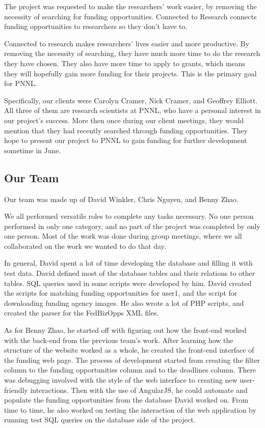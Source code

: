 \documentclass[onecolumn]{IEEEtran}
\begin{document}
The project was requested to make the researchers' work easier, by removing the necessity of searching for funding opportunities. Connected to Research connects funding opportunities to researchers so they don't have to. 

Connected to research makes researchers' lives easier and more productive. By removing the necessity of searching, they have much more time to do the research they have chosen. They also have more time to apply to grants, which means they will hopefully gain more funding for their projects. This is the primary goal for PNNL. 

Specifically, our clients were Carolyn Cramer, Nick Cramer, and Geoffrey Elliott. All three of them are research scientists at PNNL, who have a personal interest in our project's success. More then once during our client meetings, they would mention that they had recently searched through funding opportunities. They hope to present our project to PNNL to gain funding for further development sometime in June. 

\subsection{Our Team}
Our team was made up of David Winkler, Chris Nguyen, and Benny Zhao. 

We all performed versatile roles to complete any tasks necessary. No one person performed in only one category, and no part of the project was completed by only one person. Most of the work was done during group meetings, where we all collaborated on the work we wanted to do that day. 

In general, David spent a lot of time developing the database and filling it with test data. David defined most of the database tables and their relations to other tables. SQL queries used in some scripts were developed by him. David created the scripts for matching funding opportunities for user1, and the script for downloading funding agency images. He also wrote a lot of PHP scripts, and created the parser for the FedBizOpps XML files. 

As for Benny Zhao, he started off with figuring out how the front-end worked with the back-end from the previous team's work. After learning how the structure of the website worked as a whole, he created the front-end interface of the funding web page. The process of development started from creating the filter column to the funding opportunities column and to the deadlines column. There was debugging involved with the style of the web interface to creating new user-friendly interactions. Then with the use of AngularJS, he could automate and populate the funding opportunities from the database David worked on. From time to time, he also worked on testing the interaction of the web application by running test SQL queries on the database side of the project.  
\end{document}
